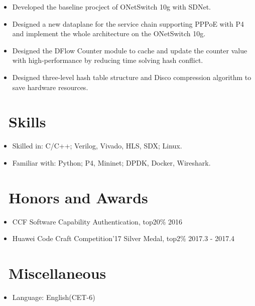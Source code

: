 \documentclass{resume}
\begin{document}
\begin{itemize}
  \item Developed the baseline procject of ONetSwitch 10g with SDNet.
  \item Designed a new dataplane for the service chain supporting PPPoE with P4 and implement the whole architecture on the ONetSwitch 10g.

\end{itemize}

\begin{itemize}
  \item Designed the DFlow Counter module to cache and update the counter value with high-performance by reducing time solving hash conflict.
  \item Designed three-level hash table structure and Disco compression algorithm to save hardware resources.
\end{itemize}


\section{\faCogs\ Skills}
\begin{itemize}[parsep=0.5ex]
  \item Skilled in: C/C++; Verilog, Vivado, HLS, SDX; Linux.
  \item Familiar with: Python; P4, Mininet; DPDK, Docker, Wireshark.
\end{itemize}

\section{\faHeartO\ Honors and Awards}
\begin{itemize}[parsep=0.5ex]
  \item {CCF Software Capability Authentication, top20\% } \hfill  {2016}
  \item {Huawei Code Craft Competition'17 Silver Medal, top2\%} \hfill{2017.3 - 2017.4}
\end{itemize}

\section{\faInfo\ Miscellaneous}
\begin{itemize}[parsep=0.5ex]
  \item Language: English(CET-6)
\end{itemize}

%
%
\end{document}
